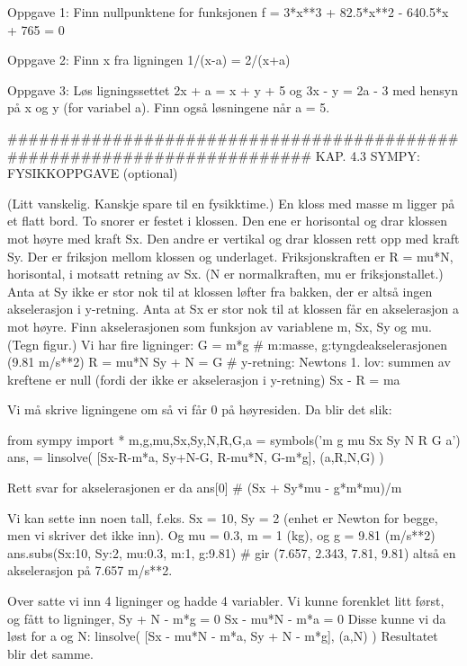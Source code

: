 \documentclass[a4paper,11pt,utf8]{book}
\begin{document}
Oppgave 1: Finn nullpunktene for funksjonen f = 3*x**3 + 82.5*x**2 - 640.5*x + 765 = 0


Oppgave 2: Finn x fra ligningen   1/(x-a) = 2/(x+a)


Oppgave 3: Løs ligningssettet 2x + a = x + y + 5  og  3x - y = 2a - 3  med hensyn på x og y (for variabel a).
Finn også løsningene når a = 5. 



######################################################################## 
KAP. 4.3  SYMPY: FYSIKKOPPGAVE  (optional)

(Litt vanskelig. Kanskje spare til en fysikktime.) 
En kloss med masse m ligger på et flatt bord. 
To snorer er festet i klossen.
Den ene er horisontal og drar klossen mot høyre med kraft Sx.
Den andre er vertikal og drar klossen rett opp med kraft Sy.
Der er friksjon mellom klossen og underlaget.
Friksjonskraften er R = mu*N, horisontal, i motsatt retning av Sx.
(N er normalkraften, mu er friksjonstallet.) 
Anta at Sy ikke er stor nok til at klossen løfter fra bakken, der er altså ingen akselerasjon i y-retning.
Anta at Sx er stor nok til at klossen får en akselerasjon a mot høyre. 
Finn akselerasjonen som funksjon av variablene m, Sx, Sy og mu. 
(Tegn figur.) 
Vi har fire ligninger:
G = m*g       # m:masse, g:tyngdeakselerasjonen (9.81 m/s**2)
R = mu*N      
Sy + N = G    # y-retning: Newtons 1. lov: summen av kreftene er null (fordi der ikke er akselerasjon i y-retning)
Sx - R = ma

Vi må skrive ligningene om så vi får 0 på høyresiden. 
Da blir det slik:

from sympy import *
m,g,mu,Sx,Sy,N,R,G,a = symbols('m g mu Sx Sy N R G a')
ans, = linsolve( [Sx-R-m*a, Sy+N-G, R-mu*N, G-m*g], (a,R,N,G) )

Rett svar for akselerasjonen er da
ans[0]        # (Sx + Sy*mu - g*m*mu)/m

Vi kan sette inn noen tall, f.eks. Sx = 10, Sy = 2 (enhet er Newton for begge, men vi skriver det ikke inn).
Og mu = 0.3, m = 1 (kg), og g = 9.81 (m/s**2)
ans.subs({Sx:10, Sy:2, mu:0.3, m:1, g:9.81})   # gir (7.657, 2.343, 7.81, 9.81)
altså en akselerasjon på 7.657 m/s**2.



Over satte vi inn 4 ligninger og hadde 4 variabler.
Vi kunne forenklet litt først, og fått to ligninger,
Sy + N - m*g = 0
Sx - mu*N - m*a = 0
Disse kunne vi da løst for a og N:
linsolve( [Sx - mu*N - m*a, Sy + N - m*g], (a,N) )
Resultatet blir det samme. 
\end{document}
